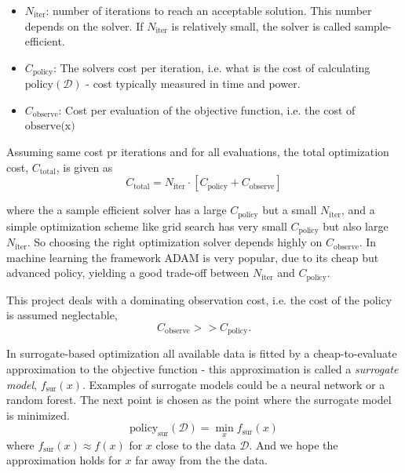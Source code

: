 \begin{itemize}[noitemsep]
    \item $N_{\text{iter}}$: number of iterations to reach an acceptable solution. This number depends on the
    solver. If $N_{\text{iter}}$ is relatively small, the solver is called sample-efficient. 
    \item $C_{\text{policy}}$: The solvers cost per iteration, i.e. what is the cost of calculating
    $\text{policy}(\mathcal{D})$  - cost typically measured in time and power. 
    \item $C_{\text{observe}}$: Cost per evaluation of the objective function, i.e. the cost of $\text{observe(x)}$
\end{itemize}
Assuming same cost pr iterations and for all evaluations, the total optimization cost, $C_{\text{total}}$, is given as 
$$C_{\text{total}} = N_{\text{iter}} \cdot \left[ C_{\text{policy}} + C_{\text{observe}}\right]$$

where the a sample efficient solver has a large $C_{\text{policy}}$ but a small $N_{\text{iter}}$, and
a simple optimization scheme like grid search has  very small $C_{\text{policy}}$ but also large $N_{\text{iter}}$. 
So choosing the right optimization solver depends highly on $C_{\text{observe}}$. In machine learning the framework 
ADAM is very popular, due to its cheap but advanced policy, yielding a good trade-off between $N_{\text{iter}}$ and 
$C_{\text{policy}}$.

This project deals with a dominating observation cost, i.e. the cost of the policy is assumed
neglectable,  $$C_{\text{observe}}>>C_{\text{policy}}.$$

\begin{testexample}[Surrogate-based optimization]
    In surrogate-based optimization all available data is fitted by a cheap-to-evaluate
    approximation to the objective function - this approximation is called a \textit{surrogate
    model}, $f_{\text{sur}}(x)$. Examples of surrogate models could be a neural network or a random forest. The next
    point is chosen as the point where the surrogate model is minimized. 
    $$\text{policy}_{\text{sur}}(\mathcal{D}) = \min_x f_{\text{sur}}(x)$$
    where $f_{\text{sur}}(x) \approx f(x)$ for $x$ close to the data $\mathcal{D}$. And we hope the approximation
    holds for $x$ far away from the the data.
\end{testexample}

